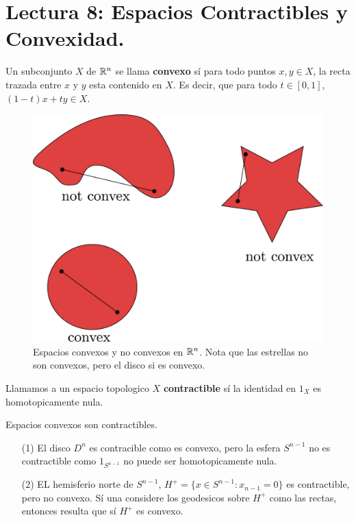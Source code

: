 \section*{Lectura 8: Espacios Contractibles y Convexidad.}

\begin{definition}
    Un subconjunto $X$ de $\mathbb{R}^n$ se llama \textbf{convexo} s\'i para todo puntos
    $x,y \in X$, la recta trazada entre $x$ y  $y$ esta contenido en  $X$. Es
    decir, que para todo  $t \in [0,1]$, $(1-t)x+ty \in X$.
\end{definition}

\begin{figure}[h]
    \centering
    \includegraphics[scale=0.1]{Figures/convex.eps}
    \caption{Espacios convexos y no convexos en $\mathbb{R}^n$. Nota que las estrellas
    no son convexos, pero el disco si es convexo.}
    \label{fig_18}
\end{figure}

\begin{definition}
    Llamamos a un espacio topologico $X$  \textbf{contractible} s\'i la
    identidad en $1_X$ es homotopicamente nula.
\end{definition}

\begin{lemma}\label{lemma_8.13}
    Espacios convexos son contractibles.
\end{lemma}

\begin{example}\label{}
    \begin{enumerate}
        \item[(1)] El disco $D^n$ es contracible como es convexo, pero la esfera
            $S^{n-1}$ no es contractible como $1_{S^{n-1}}$ no puede ser
            homotopicamente nula.

        \item[(2)] EL hemisferio norte de $S^{n-1}$, $H^+=\{x \in S^{n-1} :
            x_{n-1}=0\}$ es contractible, pero no convexo. S\'i una considere
            los geodesicos sobre $H^+$ como las rectas, entonces resulta que
            s\'i  $H^+$ es convexo.
    \end{enumerate}
\end{example}

